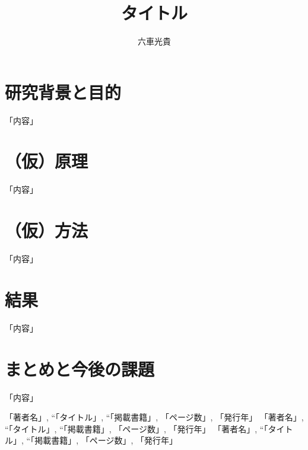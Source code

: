 \documentclass[11pt]{abst5lab}
\title{タイトル}
\author{六車光貴}
\affil{山本研究室}
\begin{document}
\maketitle

\thispagestyle{empty}

\section{研究背景と目的}


「内容」

\section{（仮）原理}



「内容」


\section{（仮）方法}
「内容」


\section{結果}
「内容」


\section{まとめと今後の課題}


「内容」

\begin{thebibliography}{9}
 
    「著者名」, ``「タイトル」, ``「掲載書籍」, 「ページ数」, 「発行年」 
   「著者名」, ``「タイトル」, ``「掲載書籍」, 「ページ数」, 「発行年」 
   「著者名」, ``「タイトル」, ``「掲載書籍」, 「ページ数」, 「発行年」 


\end{thebibliography}
\end{document}
